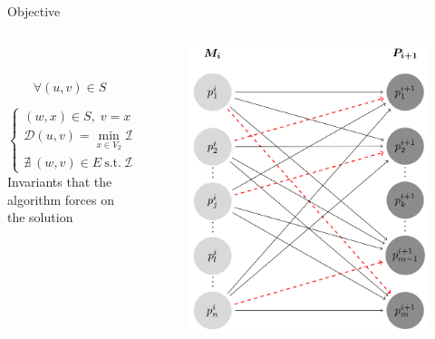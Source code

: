 \documentclass{beamer}
\begin{document}
			
\begin{frame}{Objective}
		
\begin{columns}[T] %
\begin{column}{.40\textwidth}

\hfill \\ \hfill
\hfill \\ \hfill
\[
\forall (u,v) \in S 
\]

\[
\left\{
  \begin{array}{lr}
   (w,x) \in S,\; v=x\Longleftrightarrow u=w\\
   \mathcal{D}(u,v) = \min_{x \in V_2} \mathcal{D}(u,x)  \\
    \nexists \: (w,v) \in E \: \mbox{s.t.} \: \mathcal{D}(w,v) < \mathcal{D}(u,v)
  \end{array}
\right.
\label{matchConstraints}
\]
Invariants that the algorithm forces on the solution
\end{column}%
\hfill%
\begin{column}{.48\textwidth}


		\begin{figure}
					\centering
					\includegraphics[scale=0.19]{./images/graph.png}
					
				\end{figure}
\end{column}%
\end{columns}
\end{frame}
	
\end{document}
